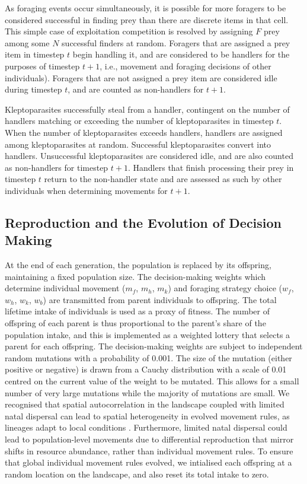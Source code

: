\documentclass[11pt]{article}
\begin{document}
As foraging events occur simultaneously, it is possible for more foragers to be considered successful in finding prey than there are discrete items in that cell.
This simple case of exploitation competition is resolved by assigning $F$ prey among some $N$ successful finders at random.
Foragers that are assigned a prey item in timestep $t$ begin handling it, and are considered to be handlers for the purposes of timestep $t+1$, i.e., movement and foraging decisions of other individuals).
Foragers that are not assigned a prey item are considered idle during timestep $t$, and are counted as non-handlers for $t+1$.

Kleptoparasites successfully steal from a handler, contingent on the number of handlers matching or exceeding the number of kleptoparasites in timestep $t$.
When the number of kleptoparasites exceeds handlers, handlers are assigned among kleptoparasites at random.
Successful kleptoparasites convert into handlers.
Unsuccessful kleptoparasites are considered idle, and are also counted as non-handlers for timestep $t+1$.
Handlers that finish processing their prey in timestep $t$ return to the non-handler state and are assessed as such by other individuals when determining movements for $t+1$.

\subsection{Reproduction and the Evolution of Decision Making}

At the end of each generation, the population is replaced by its offspring, maintaining a fixed population size. 
The decision-making weights which determine individual movement ($m_f$, $m_h$, $m_k$) and foraging strategy choice ($w_f$, $w_h$, $w_k$, $w_b$) are transmitted from parent individuals to offspring.
The total lifetime intake of individuals is used as a proxy of fitness.
The number of offspring of each parent is thus proportional to the parent's share of the population intake, and this is implemented as a weighted lottery that selects a parent for each offspring.
The decision-making weights are subject to independent random mutations with a probability of 0.001.
The size of the mutation (either positive or negative) is drawn from a Cauchy distribution with a scale of 0.01 centred on the current value of the weight to be mutated.
This allows for a small number of very large mutations while the majority of mutations are small.
We recognised that spatial autocorrelation in the landscape coupled with limited natal dispersal can lead to spatial heterogeneity in evolved movement rules, as lineages adapt to local conditions \citep[][]{wolf2010}.
Furthermore, limited natal dispersal could lead to population-level movements due to differential reproduction that mirror shifts in resource abundance, rather than individual movement rules.
To ensure that global individual movement rules evolved, we intialised each offspring at a random location on the landscape, and also reset its total intake to zero.
\end{document}
